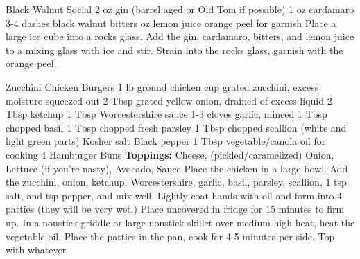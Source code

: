\documentclass[12pt]{cookbook}
\begin{document}
\begin{recipe}{Black Walnut Social}
\ingredients
{2 oz gin (barrel aged or Old Tom if possible)}
{1 oz cardamaro}
{3-4 dashes black walnut bitters}
{ oz lemon juice}
{orange peel for garnish}
\stopingredients
\preparation
{Place a large ice cube into a rocks glass.}
{Add the gin, cardamaro, bitters, and lemon juice to a mixing glass with ice and stir.}
{Strain into the rocks glass, garnish with the orange peel.}
\stopprep
\end{recipe}
\begin{recipe}{Zucchini Chicken Burgers}
\ingredients
{1 lb ground chicken}
{ cup grated zucchini, excess moisture squeezed out}
{2 Tbsp grated yellow onion, drained of excess liquid}
{2 Tbsp ketchup}
{1 Tbsp Worcestershire sauce}
{1-3 cloves garlic, minced}
{1 Tbsp chopped basil}
{1 Tbsp chopped fresh parsley}
{1 Tbsp chopped scallion (white and light green parts)}
{Kosher salt}
{Black pepper}
{1 Tbsp vegetable/canola oil for cooking}
{4 Hamburger Buns}
{\textbf{Toppings:} Cheese, (pickled/caramelized) Onion, Lettuce (if you're nasty), Avocado, Sauce}
\stopingredients
\preparation
{Place the chicken in a large bowl. Add the zucchini, onion, ketchup, Worcestershire, garlic, basil, parsley, scallion, 1 tsp salt, and  tsp pepper, and mix well.}
{Lightly coat hands with oil and form into 4 patties (they will be very wet.) Place uncovered in fridge for 15 minutes to firm up.}
{In a nonstick griddle or large nonstick skillet over medium-high heat, heat the vegetable oil. Place the patties in the pan, cook for 4-5 minutes per side.}
{Top with whatever}
\stopprep
\end{recipe}
\end{document}
